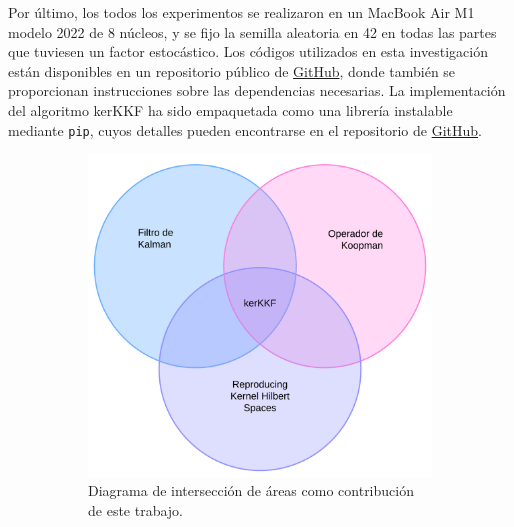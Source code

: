 Por último, los todos los experimentos se realizaron en un MacBook Air M1 modelo 2022 de 8 núcleos, y se fijo la semilla aleatoria en 42 en todas las partes que tuviesen un factor estocástico. Los códigos utilizados en esta investigación están disponibles en un repositorio público de \href{https://github.com/diegoolguinw/Koopman_nonlinear_filter}{GitHub}, donde también se proporcionan instrucciones sobre las dependencias necesarias. La implementación del algoritmo kerKKF ha sido empaquetada como una librería instalable mediante \texttt{pip}, cuyos detalles pueden encontrarse en el repositorio de \href{https://github.com/diegoolguinw/kkf}{GitHub}.

\begin{figure}[h]
    \centering
    \begin{subfigure}[b]{0.45\linewidth}
        \includegraphics[width=0.9\linewidth]{img/content/chapter1/Venn_Diagram_Thesis.pdf}
        \caption{Diagrama de intersección de áreas como contribución de este trabajo.}
        \label{fig:venn_diagram}
    \end{subfigure}
    \begin{subfigure}[b]{0.45\linewidth}

\end{subfigure}
\end{figure}
